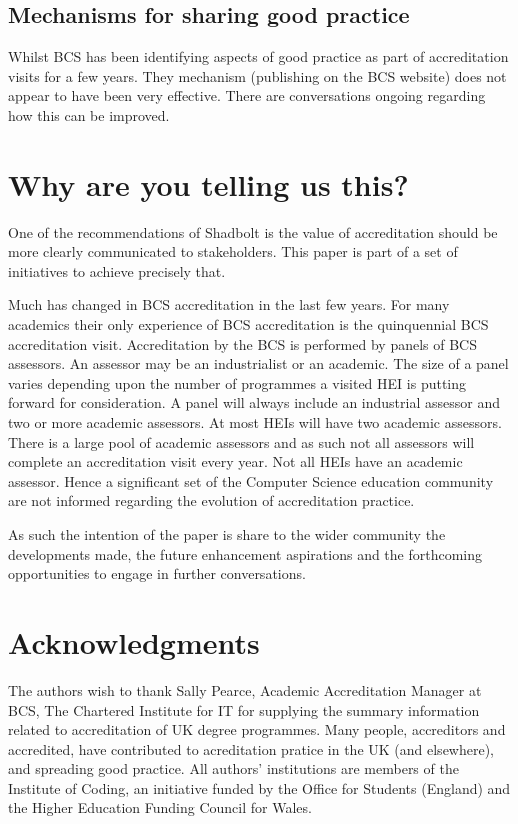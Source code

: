 \documentclass[sigconf]{acmart}
\begin{document}
\subsection {Mechanisms for sharing good practice}
Whilst BCS has been identifying aspects of good practice as part of accreditation visits for a few years. They mechanism (publishing on the BCS website) does not appear to have been very effective.  There are conversations ongoing regarding how this can be improved.

\section{Why are you telling us this?}	

One of the recommendations of Shadbolt is the value of accreditation should be more clearly communicated to stakeholders. This paper is part of a set of initiatives to achieve precisely that.

Much has changed in BCS accreditation in the last few years. For many academics their only experience of BCS accreditation is the quinquennial BCS accreditation visit. Accreditation by the BCS is performed by panels of BCS assessors. An assessor may be an industrialist or an academic. The size of a panel varies depending upon the number of programmes a visited HEI is putting forward for consideration. A panel will always include an industrial assessor and two or more academic assessors.  At most HEIs will have two academic assessors.  There is a large pool of academic assessors and as such not all assessors will complete an accreditation visit every year. Not all HEIs have an academic assessor. Hence a significant set of the Computer Science education community are not informed regarding the evolution of accreditation practice.

As such the intention of the paper is share to the wider community the developments made, the future enhancement aspirations and the forthcoming opportunities to engage in further conversations.

\section{Acknowledgments}
The authors wish to thank Sally Pearce, Academic Accreditation Manager at BCS, The Chartered Institute for IT for supplying the summary information related to accreditation of UK degree programmes. Many people, accreditors and accredited, have contributed to acreditation pratice in the UK (and elsewhere), and spreading good practice.  All authors' institutions are members of the Institute of Coding, an initiative funded by the Office for Students (England) and the Higher Education Funding Council for Wales.

%

\end{document}
